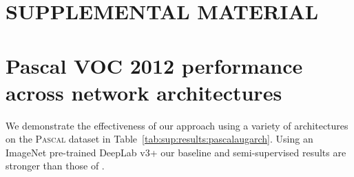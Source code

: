 \documentclass{bmvc2k}
\newcommand{\Pascal}{\textsc{Pascal}}
\begin{document}





\appendix


\section*{SUPPLEMENTAL MATERIAL}

\section{Pascal VOC 2012 performance across network architectures}

We demonstrate the effectiveness of our approach using a variety of architectures on the \Pascal{} dataset in Table~\ref{tab:sup:results:pascalaugarch}.
Using an ImageNet pre-trained DeepLab v3+ our baseline and semi-supervised results are stronger than those of \cite{Mittal:SSSHiLow}.
\end{document}
